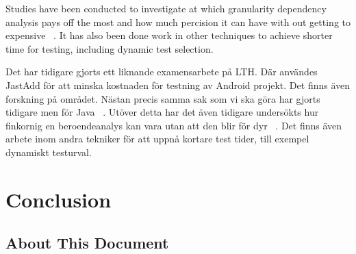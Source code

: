 \documentclass{cslthse-msc}
\begin{document}
Studies have been conducted to investigate at which granularity dependency analysis pays off the most and how much percision it can have with out getting to expensive ~\cite{DBLP:conf/sigsoft/LegunsenHSLZM16}. It has also been done work in other techniques to achieve shorter time for testing, including dynamic test selection.

Det har tidigare gjorts ett liknande examensarbete på LTH. Där användes JastAdd för att minska kostnaden för testning av Android projekt. Det finns även forskning på området. Nästan precis samma sak som vi ska göra har gjorts tidigare men för Java ~\cite{DBLP:conf/pppj/OqvistHM16}. Utöver detta har det även tidigare undersökts hur finkornig en beroendeanalys kan vara utan att den blir för dyr ~\cite{DBLP:conf/sigsoft/LegunsenHSLZM16}. Det finns även arbete inom andra tekniker för att uppnå kortare test tider, till exempel dynamiskt testurval.
\chapter[Conclusion]{Conclusion}

\begin{appendices}
\chapter{About This Document}
\end{appendices}
\end{document}
